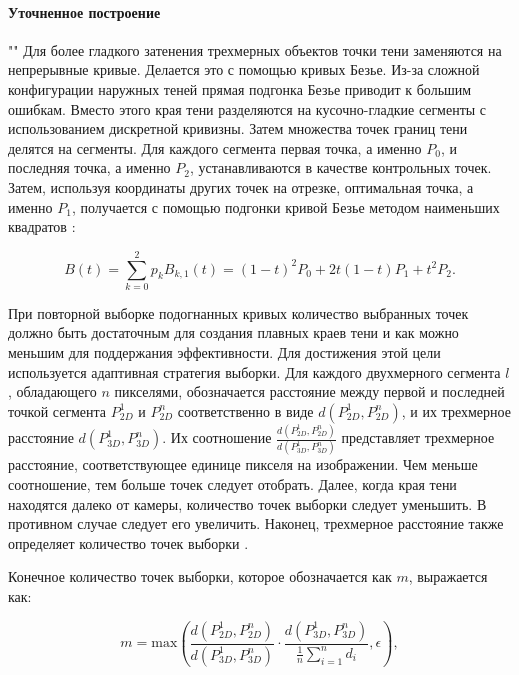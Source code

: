 \paragraph*{Уточненное построение} 
""\newline\indent
Для более гладкого затенения трехмерных объектов точки тени заменяются на непрерывные кривые. Делается это с помощью кривых Безье. Из-за сложной конфигурации наружных теней прямая подгонка Безье приводит к большим ошибкам. Вместо этого края тени разделяются на кусочно-гладкие сегменты с использованием дискретной кривизны. Затем множества точек границ тени делятся на сегменты. Для каждого сегмента первая точка, а именно $P_0$, и последняя точка, а именно $P_2$, устанавливаются в качестве контрольных точек. Затем, используя координаты других точек на отрезке, оптимальная точка, а именно $P_1$, получается с помощью подгонки кривой Безье методом наименьших квадратов \cite{wei2019simulating}:

\begin{equation}
	B(t) = \sum_{k=0}^{2} p_k B_{k, 1} (t) = (1 - t) ^ 2 P_0 + 2t(1 - t)P_1 + t^2 P_2.
\end{equation}

При повторной выборке подогнанных кривых количество выбранных точек должно быть достаточным для создания плавных краев тени и как можно меньшим для поддержания эффективности. Для достижения этой цели используется адаптивная стратегия выборки. Для каждого двухмерного сегмента $l$, обладающего $n$ пикселями, обозначается расстояние между первой и последней точкой сегмента $P_{2D}^1$ и $P_{2D}^n$ соответственно в виде $d(P_{2D}^1, P_{2D}^n)$, и их трехмерное расстояние $d(P_{3D}^1, P_{3D}^n)$. Их соотношение $\frac{d(P_{2D}^1, P_{2D}^n)}{d(P_{3D}^1, P_{3D}^n)}$ представляет трехмерное расстояние, соответствующее единице пикселя на изображении. Чем меньше соотношение, тем больше точек следует отобрать. Далее, когда края тени находятся далеко от камеры, количество точек выборки следует уменьшить. В противном случае следует его увеличить. Наконец, трехмерное расстояние также определяет количество точек выборки \cite{wei2019simulating}.

Конечное количество точек выборки, которое обозначается как $m$, выражается как:

\begin{equation}
	m = \text{max}(\frac{d(P_{2D}^1, P_{2D}^n)}{d(P_{3D}^1, P_{3D}^n)} \cdot \frac{d(P_{3D}^1, P_{3D}^n)}{\frac{1}{n} \sum_{i=1}^{n} d_i}, \epsilon),
\end{equation}

